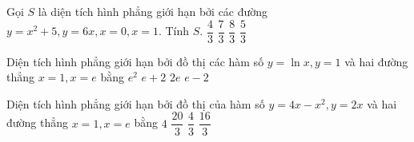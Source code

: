 \begin{ex}%
	Gọi $S$ là diện tích hình phẳng giới hạn bởi các đường $y=x^2+5, y=6 x, x=0, x=1$. Tính $S$.
\choice
{$\dfrac{4}{3}$}
{\True $\dfrac{7}{3}$}
{$\dfrac{8}{3}$}
{$\dfrac{5}{3}$}
\end{ex}
\begin{ex}%
	Diện tích hình phẳng giới hạn bởi đồ thị các hàm số $y=\ln x, y=1$ và hai đường thẳng $x=1, x=e$ bằng
\choice
{$e^2$}
{$e+2$}
{$2 e$}
{\True $e-2$}
\end{ex}
\begin{ex}%
	Diện tích hình phẳng giới hạn bởi đồ thị của hàm số $y=4 x-x^2, y=2 x$ và hai đường thẳng $x=1, x=e$ bằng
\choice
{$4$}
{$\dfrac{20}{3}$}
{\True $\dfrac{4}{3}$}
{$\dfrac{16}{3}$}
\end{ex}
